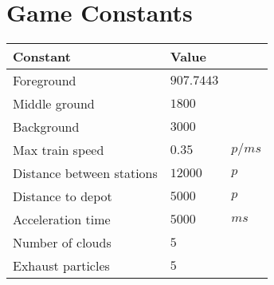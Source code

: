 \chapter{Game Constants}

\begin{table}[H]
\centering
\begin{tabular}{| l | l l |}
\hline
\textbf{Constant} & \textbf{Value} & \\
\hline
Foreground & $907.7443$ &\\
Middle ground & $1800$ &\\
Background & $3000$ &\\
Max train speed & $0.35$ & $p/ms$\\
Distance between stations & $12000$ & $p$\\
Distance to depot & $5000$ & $p$\\
Acceleration time & $5000$ & $ms$\\
Number of clouds & $5$ &\\
Exhaust particles & $5$ &\\
\hline
\end{tabular}
\end{table}
